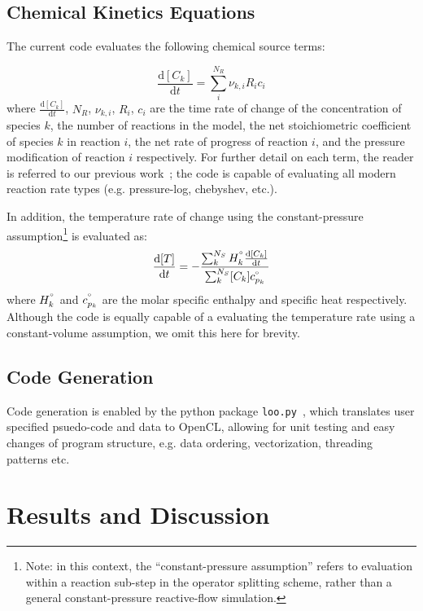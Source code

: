 \documentclass[12pt]{ussci}
\begin{document}
\subsection{Chemical Kinetics Equations}
The current code evaluates the following chemical source terms:

\begin{equation}
\frac{\text{d}[C_k]}{\text{d}t} = \sum_{i}^{N_R} \nu_{k,i} R_i c_i
\end{equation}
where $\frac{\text{d}[C_k]}{\text{d}t}$, $N_R$, $\nu_{k,i}$, ${R_i}$, $c_i$ are the time rate of change of the concentration of species $k$, the number of reactions in the model, the net stoichiometric coefficient of species $k$ in reaction $i$, the net rate of progress of reaction $i$, and the pressure modification of reaction $i$ respectively.
For further detail on each term, the reader is referred to our previous work~\cite{Niemeyer:2016aa}; the code is capable of evaluating all modern reaction rate types (e.g. pressure-log, chebyshev, etc.).

In addition, the temperature rate of change using the constant-pressure assumption\footnote{Note: in this context, the ``constant-pressure assumption'' refers to evaluation within a reaction sub-step in the operator splitting scheme, rather than a general constant-pressure reactive-flow simulation.} is evaluated as:
\begin{equation}
\frac{\text{d}[T]}{\text{d}t} = -\frac{\sum_{k}^{N_S} H^{\degree}_k \frac{\text{d}[C_k]}{\text{d}t}}{\sum_{k}^{N_S} [C_k] c_{p_k}^{\degree}}
\end{equation}
where $H^{\degree}_k$ and $c_{p_k}^{\degree}$ are the molar specific enthalpy and specific heat respectively.
Although the code is equally capable of a evaluating the temperature rate using a constant-volume assumption, we omit this here for brevity.

\subsection{Code Generation}
Code generation is enabled by the python package \texttt{loo.py}~\cite{kloeckner_loopy_2014}, which translates user specified psuedo-code and data to OpenCL, allowing for unit testing and easy changes of program structure, e.g. data ordering, vectorization, threading patterns etc.

\section{Results and Discussion}
\end{document}
